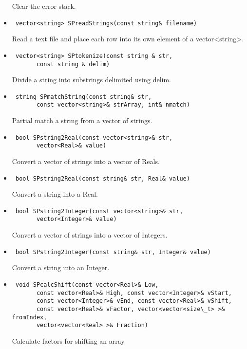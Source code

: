 \documentclass[11pt]{book}
\begin{document}
\begin{itemize}
          Clear the error stack.

\item  \begin{verbatim} vector<string> SPreadStrings(const string& filename) \end{verbatim}

          Read a text file and place each row into its own element of
          a vector<string>.

\item  \begin{verbatim} vector<string> SPtokenize(const string & str, 
       const string & delim) \end{verbatim}

          Divide a string into substrings delimited using delim.

\item  \begin{verbatim} string SPmatchString(const string& str, 
       const vector<string>& strArray, int& nmatch) \end{verbatim}

          Partial match a string from a vector of strings.

\item  \begin{verbatim} bool SPstring2Real(const vector<string>& str, 
       vector<Real>& value) \end{verbatim}

          Convert a vector of strings into a vector of Reals.

\item  \begin{verbatim} bool SPstring2Real(const string& str, Real& value) \end{verbatim}

          Convert a string into a Real.

\item  \begin{verbatim} bool SPstring2Integer(const vector<string>& str, 
       vector<Integer>& value) \end{verbatim}

          Convert a vector of strings into a vector of Integers.

\item  \begin{verbatim} bool SPstring2Integer(const string& str, Integer& value) \end{verbatim}

          Convert a string into an Integer.

\item  \begin{verbatim} void SPcalcShift(const vector<Real>& Low, 
       const vector<Real>& High, const vector<Integer>& vStart, 
       const vector<Integer>& vEnd, const vector<Real>& vShift, 
       const vector<Real>& vFactor, vector<vector<size\_t> >& fromIndex, 
       vector<vector<Real> >& Fraction) \end{verbatim}

          Calculate factors for shifting an array

\end{itemize}
\end{document}

